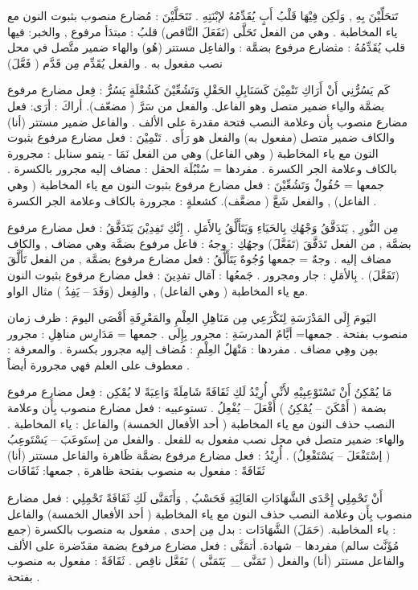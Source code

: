 \documentclass[a4paper]{article}
\begin{document}
\begin{flushright}
تَتحَلِّيْنَ بِهِ , وَلَكِن فِيْهَا قَلْبُ أَبٍ يُقَدِّمُهُ لإبْنَتِهِ .
تَتَحَلَّيْنَ : مُضارع منصوب بثبوت النون مع ياء المخاطبة .
            وهي من الفعل تَحَلَّى (تَفَعَلَ النَّاقص)
قلبُ : مبتدَأ مرفوع , والخبر: فيها قلب
يُقَدِّمُهُ : مثضارع مرفوع بضمَّة : والفاعِل مستتر (هُو) والهاء
      ضمير متَّصل في محل نصب مفعول به . والفعل يُقَدِّم  
      مِن قَدَّم ( فَعَّلَ)
 

كَم يَسُرُّنِي أَنْ أَرَاكِ تَنْمِيْنَ كَسَنَابِلِ الحَقْلِ وَتَشُعِّيْنَ كَشُعْلَةٍ
يَسُرُّ : فِعل مضارع مرفوع بضمَّة والياء ضمير متصل وهو الفاعل.
      والفعل من سَرَّ ( مضعّف).
أراكَ : أرَى: فعل مضارع منصوب بِأن وعلامة النصب فتحة مقدرة على
الألف . والفاعل ضمير مستتر (أنا) والكاف ضمير متصل (مفعول به) والفعل هو رَأَى .
تَنْمِيْنَ : فعل مضارع مرفوع بثبوت النون مع ياء المخاطبة ( وهي الفاعل)
      وهي من الفعل نَمَا - ينمو
سنابل : مجرورة بالكاف وعلامة الجر الكسرة . مفردها = سُنْبُلَة
الحقل : مضاف إليه مجرور بالكسرة . جمعها = حُقُولٌ
وَتَشُعِّيْنَ : فعل مضارع مرفوع بثبوت النون مع ياء المخاطبة ( وهي الفاعل) , والفعل شَعَّ ( مضعَّف).
كشعلةٍ : مجرورة بالكاف وعلامة الجر الكسرة .
 
مِن النُّورِ , يَتَدَفَّقُ وَجْهُكِ بِالحَيَاءِ وَيَتَأَلَّقُ بِالأَمَلِ . إِنَّكِ تَفِدِيْنَ
يَتَدَفَّقُ : فعل مضارع مرفوع بضمَّة , من الفعل تَدَفَّقَ (تَفَعَّلَ)
وجهُكِ : وجهُ : فاعل مرفوع بضمَّة وهي مضاف , والكاف مضاف إليه .
            وجهٌ = جمعها وُجُوهٌ
يَتَأَلَّقُ : فعل مضارع مرفوع بضمَّة , من الفعل تَأَلَّقَ (تَفَعَّلَ) .
بِالأمَلِ : جار ومجرور .  جَمعُها : آمَال
تفدِينَ : فعل مضارع مرفوع بثبوت النون مع ياء المخاطبة ( وهي الفاعل) , والفِعل (وَفَدَ – يَفِدُ ) مثال الواو.
 
اليَومَ إِلَى المَدْرَسَةِ لِتَكْرَعِي مِن مَنَاهِلِ العِلْمِ والمَعْرِفَةِ أَقْصَى
اليومَ : ظرف زمان منصوب بفتحة . جمعها= أيَّامٌ
المدرسَةِ : مجرور بِإِلَى . جمعها = مَدَارِس
مناهِلِ : مجرور بمِن وهِي مضاف . مفردها : مَنْهَلٌ
العِلْمِ : مُضاف إليه مجرور بكسرة .
والمعرفة : معطوف على العلم فهي مجرورة أيضاً .
 
مَا يُمْكِنُ أَنْ تَسْتَوْعِبِيْهِ لأَنِّي أُرِيْدُ لَكِ ثَقَافَةً شَامِلَةً وَاعِيَةً لا
يُمْكِن : فِعل مضارع مرفوع بضمة ( أَمْكَنَ – يُمْكِنُ ) أَفْعَلَ – يُفْعِلُ .
تستوعبيه : فعل مضارع منصوب بِأَن وعلامة النصب حذف النون مع ياء
      المخاطبة ( أحد الأفعال الخمسة) والفاعل : ياء المخاطبة . والهاء:
      ضمير متصل في محل نصب مفعول به للفعل . والفعل من
      إستَوعَبَ – يَسْتَوعِبُ ( إسْتَفْعَلَ – يَسْتَفْعِلُ) .
أُرِيْدُ : فعل مضارع مرفوع بضمَّة ظَاهرة والفاعل مستتر (أنا)
ثَقَافَةً : مفعول به منصوب بفتحة ظاهرة , جمعها: ثَقَافَات
 
أَنْ تَحْمِلِي إِحْدَى الشَّهَادَاتِ العَالِيَةِ فَحَسْبُ , وَأَتَمَنَّى لَكِ ثَقَافَةً
تَحْمِلِي : فعل مضارع منصوب بِأَن وعلامة النصب حذف النون مع ياء
      المخاطبة ( أحد الأفعال الخمسة) والفاعل : ياء المخاطبة. (حَمَلَ)
الشَّهَادَات : بدل مِن إحدى , مفعول به منصوب بالكسرة (جمع مُؤَنَّث سالم)
           مفردها – شهادة.
أتمَنَّى : فعل مضارع مرفوع بضمة مقدّضرة على الألف والفاعل مستتر   
      (أنا) والفعل ( تَمَنَّى _\ يَتَمَنَّى ) تَفَعَّل ناقِص .
ثَقَافَةً : مفعول به منصوب بفتحة .
 

\end{flushright}
\end{document}
